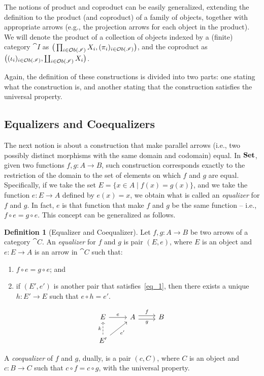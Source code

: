 \documentclass[a4paper, twoside,openright]{report}
\theoremstyle{plain}
\theoremstyle{definition}
\newtheorem{definition}[theorem]{Definition}
\begin{document}
The notions of product and coproduct can be easily generalized, extending the definition to the product (and coproduct) of a family of objects, together with appropriate arrows (e.g., the projection arrows for each object in the product). We will denote the product of a collection of objects indexed by a (finite) category $\cat I$ as $\big(\prod_{i \in \mathcal{O}b(\mathscr{I})} X_i, (\pi_i)_{i \in \mathcal{O}b(\mathscr{I})}\big)$, and the coproduct as $\big((\iota_i)_{i \in \mathcal{O}b(\mathscr{I})}, \coprod_{i \in \mathcal{O}b(\mathscr{I})} X_i\big)$.

Again, the definition of these constructions is divided into two parts: one stating what the construction is, and another stating that the construction satisfies the universal property.

\subsection{Equalizers and Coequalizers}

The next notion is about a construction that make parallel arrows (i.e., two possibly distinct morphisms with the same domain and codomain) equal. In $\mathbf{Set}$, given two functions $f, g: A \rightarrow B$, such construction corresponds exactly to the restriction of the domain to the set of elements on which $f$ and $g$ are equal. Specifically, if we take the set $E = \{x \in A \mid f(x) = g(x)\}$, and we take the function $e: E \rightarrow A$ defined by $e(x) = x$, we obtain what is called an \emph{equalizer} for $f$ and $g$. In fact, $e$ is that function that make $f$ and $g$ be the same function -- i.e., $f \circ e = g \circ e$.
This concept can be generalized as follows.

\begin{definition}[Equalizer and Coequalizer]
    Let $f, g: A \rightarrow B$ be two arrows of a category $\cat C$. An \emph{equalizer} for $f$ and $g$ is pair $(E, e)$, where $E$ is an object and $e: E \rightarrow A$ is an arrow in $\cat C$ such that:
    \begin{enumerate}
        \item \label{eq_1} $ f \circ e = g \circ e$; and
        \item if $(E', e')$ is another pair that satisfies~\ref{eq_1}, then there exists a unique $h: E' \rightarrow E$ such that $e \circ h = e'$.
    \end{enumerate}
    \[
        \begin{tikzcd}
            E \arrow[r, "e"] & A \arrow[r, shift left, "f"] \arrow[r, shift right, "g" swap] & B \\
            E' \arrow[u, dashed, "k"] \arrow[ur, "e'" swap] & 
        \end{tikzcd}
    \]

    A \emph{coequalizer} of $f$ and $g$, dually, is a pair $(c, C)$, where $C$ is an object and $c: B \rightarrow C$ such that $c \circ f = c \circ g$, with the universal property.
\end{definition}
\end{document}
